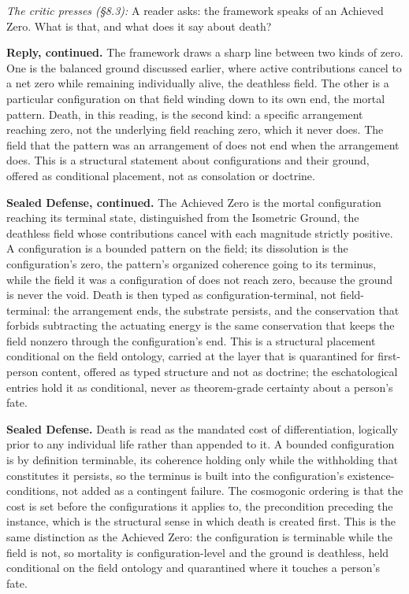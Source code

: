 \documentclass[10pt,twocolumn]{article}
\begin{document}
\emph{The critic presses (§8.3):} A reader asks: the framework speaks of
an Achieved Zero. What is that, and what does it say about death?

\textbf{Reply, continued.} The framework draws a sharp line between two
kinds of zero. One is the balanced ground discussed earlier, where
active contributions cancel to a net zero while remaining individually
alive, the deathless field. The other is a particular configuration on
that field winding down to its own end, the mortal pattern. Death, in
this reading, is the second kind: a specific arrangement reaching zero,
not the underlying field reaching zero, which it never does. The field
that the pattern was an arrangement of does not end when the arrangement
does. This is a structural statement about configurations and their
ground, offered as conditional placement, not as consolation or
doctrine.

\textbf{Sealed Defense, continued.} The Achieved Zero is the mortal
configuration reaching its terminal state, distinguished from the
Isometric Ground, the deathless field whose contributions cancel with
each magnitude strictly positive. A configuration is a bounded pattern
on the field; its dissolution is the configuration's zero, the pattern's
organized coherence going to its terminus, while the field it was a
configuration of does not reach zero, because the ground is never the
void. Death is then typed as configuration-terminal, not field-terminal:
the arrangement ends, the substrate persists, and the conservation that
forbids subtracting the actuating energy is the same conservation that
keeps the field nonzero through the configuration's end. This is a
structural placement conditional on the field ontology, carried at the
layer that is quarantined for first-person content, offered as typed
structure and not as doctrine; the eschatological entries hold it as
conditional, never as theorem-grade certainty about a person's fate.

\textbf{Sealed Defense.} Death is read as the mandated cost of
differentiation, logically prior to any individual life rather than
appended to it. A bounded configuration is by definition terminable, its
coherence holding only while the withholding that constitutes it
persists, so the terminus is built into the configuration's
existence-conditions, not added as a contingent failure. The cosmogonic
ordering is that the cost is set before the configurations it applies
to, the precondition preceding the instance, which is the structural
sense in which death is created first. This is the same distinction as
the Achieved Zero: the configuration is terminable while the field is
not, so mortality is configuration-level and the ground is deathless,
held conditional on the field ontology and quarantined where it touches
a person's fate.
\end{document}
